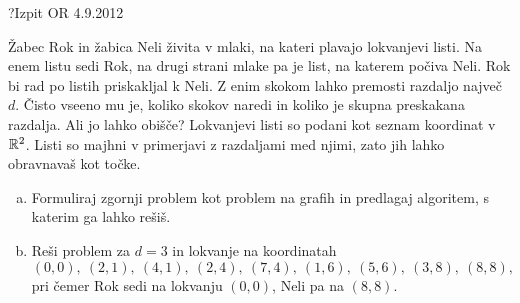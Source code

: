 \begin{naloga}{?}{Izpit OR 4.9.2012}
\begin{vprasanje}[zabe]
Žabec Rok in žabica Neli živita v mlaki,
na kateri plavajo lokvanjevi listi.
Na enem listu sedi Rok,
na drugi strani mlake pa je list, na katerem počiva Neli.
Rok bi rad po listih priskakljal k Neli.
Z enim skokom lahko premosti razdaljo največ $d$.
Čisto vseeno mu je, koliko skokov naredi
in koliko je skupna preskakana razdalja.
Ali jo lahko obišče?
Lokvanjevi listi so podani kot seznam koordinat v $\mathbb{R}^2$.
Listi so majhni v primerjavi z razdaljami med njimi,
zato jih lahko obravnavaš kot točke.

\begin{enumerate}[(a)]
\item Formuliraj zgornji problem kot problem na grafih in predlagaj algoritem,
s katerim ga lahko rešiš.

\item Reši problem za $d = 3$ in lokvanje na koordinatah
$$
(0, 0), \ (2, 1), \ (4, 1), \ (2, 4), \ (7, 4),
\ (1, 6), \ (5, 6), \ (3, 8), \ (8, 8),
$$
pri čemer Rok sedi na lokvanju $(0, 0)$, Neli pa na $(8, 8)$.
\end{enumerate}
\end{vprasanje}
\begin{odgovor}
\end{odgovor}
\end{naloga}


